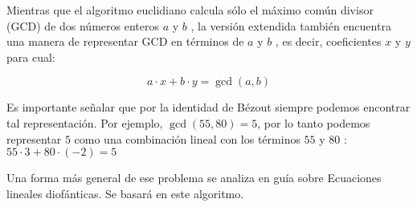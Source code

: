 Mientras que el algoritmo euclidiano calcula sólo el máximo común divisor (GCD) de dos números enteros $a$ y $b$ , la versión extendida también encuentra una manera de representar GCD en términos de $a$ y $b$ , es decir, coeficientes $x$ y $y$ para cual:

$$a \cdot x + b \cdot y = \gcd(a, b)$$

Es importante señalar que por la identidad de Bézout siempre podemos encontrar tal representación. Por ejemplo, $\gcd(55, 80) = 5$, por lo tanto podemos representar $5$ como una combinación lineal con los términos $55$ y $80$ : $55 \cdot 3 + 80 \cdot (-2) = 5$

Una forma más general de ese problema se analiza en guía sobre Ecuaciones lineales diofánticas. Se basará en este algoritmo.